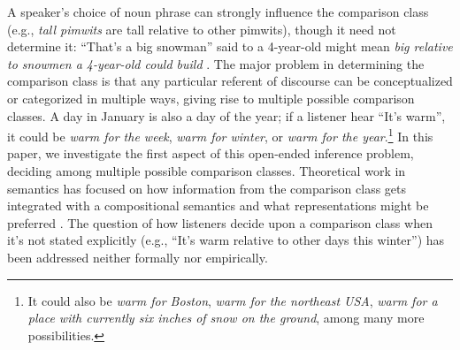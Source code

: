 \documentclass[doc]{apa6}
\begin{document}
A speaker's choice of noun phrase can strongly influence the comparison class  (e.g., \emph{tall pimwits} are tall relative to other pimwits), though it need not determine it: ``That's a big snowman'' said to a 4-year-old might mean \emph{big relative to snowmen a 4-year-old could build} \cite{kamp1975two}.  
The major problem in determining the comparison class is that any particular referent of discourse can be conceptualized or categorized in
multiple ways, giving rise to multiple possible comparison classes. A day in
January is also a day of the year; if a listener hear ``It's
warm'', it could be \emph{warm for the week}, \emph{warm for winter}, or
\emph{warm for the year}.\footnote{It could also be \emph{warm for
  Boston}, \emph{warm for the northeast USA}, \emph{warm for a place
  with currently six inches of snow on the ground}, among many more
  possibilities. } In this paper, we investigate the first aspect of
this open-ended inference problem, deciding among multiple possible comparison
classes. Theoretical work in semantics has focused on how information
from the comparison class gets integrated with a compositional semantics
and what representations might be preferred \cite{Bale2011, Solt2009}.
The question of how listeners decide upon a comparison class when it's not stated explicitly (e.g., ``It's warm relative to other days this winter'') has been addressed neither formally nor empirically.
\end{document}
